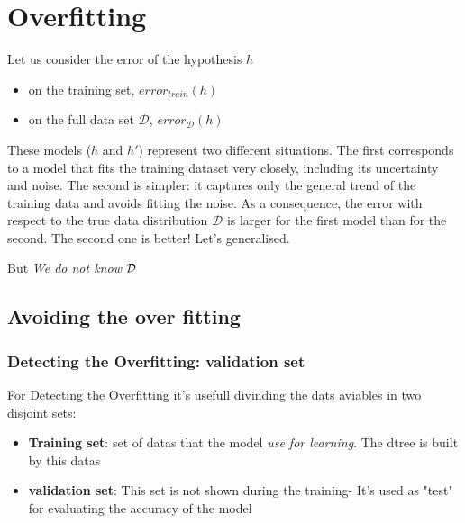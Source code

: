 \chapter{Overfitting}
Let us consider the error of the hypothesis $h$
\begin{itemize}
    \item on the training set, $error_{train}(h)$
    \item on the full data set $\mathcal{D}$, $error_{\mathcal{D}}(h)$ 
\end{itemize}


These models ($h$ and $h'$) represent two different situations.
The first corresponds to a model that fits the training dataset very closely, including its uncertainty and noise.
The second is simpler: it captures only the general trend of the training data and avoids fitting the noise.
As a consequence, the error with respect to the true data distribution $\mathcal{D}$ is larger for the first model than for the second.
The second one is better! Let's generalised.

But \textit{We do not know} $\mathcal{D}$

\section{Avoiding the over fitting}
\subsection{Detecting the Overfitting: validation set}
For Detecting the Overfitting it's usefull divinding the dats aviables in two disjoint sets:
\begin{itemize}
    \item \textbf{Training set}: set of datas that the model \textit{use for learning}. The dtree is built by this datas
    \item \textbf{validation set}: This set is not shown during the training- It's used as "test" for evaluating the accuracy of the model
\end{itemize}

